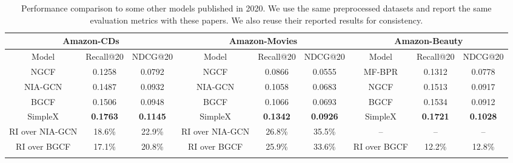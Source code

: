 \documentclass[sigconf,authorversion]{acmart}
\begin{document}
\begin{table*}[htbp]
\renewcommand\arraystretch{1.1}
\centering
\caption{Performance comparison to some other models published in 2020. We use the same preprocessed datasets and report the same evaluation metrics with these papers. We also reuse their reported results for consistency.}
\begin{tabular}{c|cc||c|cc||c|cc}
\hline
\multicolumn{3}{c||}{Amazon-CDs} & \multicolumn{3}{c||}{Amazon-Movies}    & \multicolumn{3}{c}{Amazon-Beauty}              \\ \hline
Model        & Recall@20  & \hspace{-1.5ex}NDCG@20         & Model        & Recall@20 & \hspace{-1ex}NDCG@20 & Model        & Recall@20  & \hspace{-1ex}NDCG@20\hspace{-0.5ex} \\ \hline
NGCF      & 0.1258  & 0.0792         & NGCF        & 0.0866 & 0.0555    & MF-BPR       & 0.1312 & 0.0778 \\
NIA-GCN        & 0.1487 & 0.0932       & NIA-GCN        & 0.1058  & 0.0683   & NGCF       & 0.1513  & 0.0917  \\ 
BGCF        & 0.1506  & 0.0948          & BGCF       & 0.1066 & 0.0693   & BGCF      & 0.1534 & 0.0912 \\ \hline 
SimpleX  & \textbf{0.1763}  & \textbf{0.1145}  & SimpleX & \textbf{0.1342} &  \textbf{0.0926}  & SimpleX & \textbf{0.1721}  & \textbf{0.1028}  \\ \hline
\hspace{-1ex}RI over NIA-GCN & 18.6\%  & 22.9\%           & RI over NIA-GCN & 26.8\%       & 35.5\%    & --  & --  & --  \\
RI over BGCF & 17.1\%  & 20.8\%           & RI over BGCF & 25.9\%       & 33.6\%    & RI over BGCF & 12.2\%  & 12.8\%   \\\hline
\multicolumn{9}{c}{\vspace{-0.6ex}}\\


\end{tabular}
\end{table*}
\end{document}
